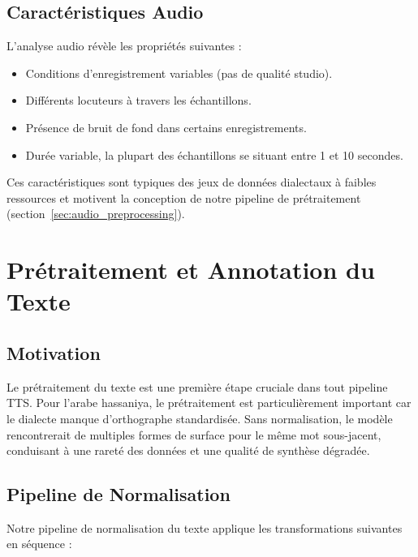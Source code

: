 \documentclass[12pt,a4paper]{article}
\begin{document}
\subsection{Caractéristiques Audio}

L'analyse audio révèle les propriétés suivantes :

\begin{itemize}
    \item Conditions d'enregistrement variables (pas de qualité studio).
    \item Différents locuteurs à travers les échantillons.
    \item Présence de bruit de fond dans certains enregistrements.
    \item Durée variable, la plupart des échantillons se situant entre 1 et 10 secondes.
\end{itemize}

Ces caractéristiques sont typiques des jeux de données dialectaux à faibles ressources et motivent la conception de notre pipeline de prétraitement (section~\ref{sec:audio_preprocessing}).

\section{Prétraitement et Annotation du Texte}
\label{sec:text_preprocessing}

\subsection{Motivation}

Le prétraitement du texte est une première étape cruciale dans tout pipeline TTS. Pour l'arabe hassaniya, le prétraitement est particulièrement important car le dialecte manque d'orthographe standardisée. Sans normalisation, le modèle rencontrerait de multiples formes de surface pour le même mot sous-jacent, conduisant à une rareté des données et une qualité de synthèse dégradée.

\subsection{Pipeline de Normalisation}

Notre pipeline de normalisation du texte applique les transformations suivantes en séquence :
\end{document}
